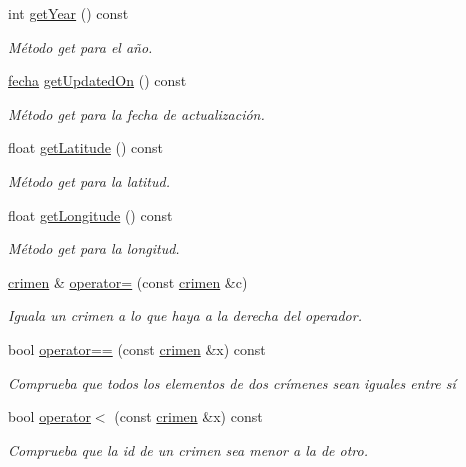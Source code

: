 \begin{DoxyCompactItemize}
int \hyperlink{classcrimen_ae3c88912aa55315043707a449d23413f}{get\-Year} () const 
\begin{DoxyCompactList}\small\item\em Método get para el año. \end{DoxyCompactList}\item 
\hyperlink{classfecha}{fecha} \hyperlink{classcrimen_a6f26150b403ab2cdb27bb7e9d8da4125}{get\-Updated\-On} () const 
\begin{DoxyCompactList}\small\item\em Método get para la fecha de actualización. \end{DoxyCompactList}\item 
float \hyperlink{classcrimen_af4e2bf4ac80a7c786cc2cc3ce681def8}{get\-Latitude} () const 
\begin{DoxyCompactList}\small\item\em Método get para la latitud. \end{DoxyCompactList}\item 
float \hyperlink{classcrimen_abdc0c42fac070cd241c663334bc964aa}{get\-Longitude} () const 
\begin{DoxyCompactList}\small\item\em Método get para la longitud. \end{DoxyCompactList}\item 
\hyperlink{classcrimen}{crimen} \& \hyperlink{classcrimen_a612c4d3beaabd588703e4a580caf04e5}{operator=} (const \hyperlink{classcrimen}{crimen} \&c)
\begin{DoxyCompactList}\small\item\em Iguala un crimen a lo que haya a la derecha del operador. \end{DoxyCompactList}\item 
bool \hyperlink{classcrimen_aeced9ce4b7486123412975b8884d1ab7}{operator==} (const \hyperlink{classcrimen}{crimen} \&x) const 
\begin{DoxyCompactList}\small\item\em Comprueba que todos los elementos de dos crímenes sean iguales entre sí \end{DoxyCompactList}\item 
bool \hyperlink{classcrimen_ac865fdb9712f2426d947b1b5546b50e5}{operator$<$} (const \hyperlink{classcrimen}{crimen} \&x) const 
\begin{DoxyCompactList}\small\item\em Comprueba que la id de un crimen sea menor a la de otro. \end{DoxyCompactList}\item 

\end{DoxyCompactItemize}
